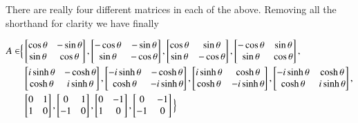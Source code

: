 There are really four different matrices in each of the above.  Removing all the shorthand for clarity we have finally

\begin{align*}
A \in \Bigr\{
&\begin{bmatrix}
\cos\theta & - \sin\theta \\
\sin\theta & \cos\theta \\
\end{bmatrix}, 
\begin{bmatrix}
-\cos\theta & - \sin\theta \\
\sin\theta & -\cos\theta \\
\end{bmatrix}, 
\begin{bmatrix}
\cos\theta & \sin\theta \\
\sin\theta & - \cos\theta \\
\end{bmatrix}, 
\begin{bmatrix}
-\cos\theta & \sin\theta \\
\sin\theta & \cos\theta \\
\end{bmatrix}, \\
& 
\begin{bmatrix}
i \sinh\theta & -\cosh\theta \\
\cosh\theta  & i \sinh\theta \\
\end{bmatrix}, 
\begin{bmatrix}
-i \sinh\theta & -\cosh\theta \\
\cosh\theta  & -i \sinh\theta \\
\end{bmatrix}, 
\begin{bmatrix}
i \sinh\theta & \cosh\theta \\
\cosh\theta  & - i \sinh\theta \\
\end{bmatrix}, 
\begin{bmatrix}
-i \sinh\theta & \cosh\theta \\
\cosh\theta  & i \sinh\theta \\
\end{bmatrix}, 
\\
&
\begin{bmatrix}
0 & 1 \\
1 & 0 \\
\end{bmatrix},
\begin{bmatrix}
0 & 1 \\
-1 & 0 \\
\end{bmatrix},
\begin{bmatrix}
0 & -1 \\
1 & 0 \\
\end{bmatrix},
\begin{bmatrix}
0 & -1 \\
-1 & 0 \\
\end{bmatrix}
\Bigl\}
\end{align*}

